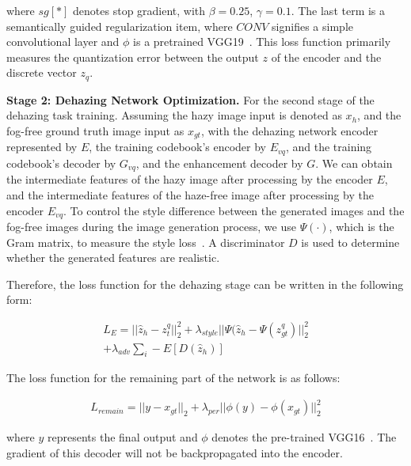 \documentclass[journal]{IEEEtran}
\begin{document}
\noindent where $sg[*]$ denotes stop gradient, with $\beta = 0.25$, $\gamma = 0.1$. The last term is a semantically guided regularization item, where $CONV$ signifies a simple convolutional layer and $\phi$ is a pretrained VGG19~\cite{simonyan2014very}. This loss function primarily measures the quantization error between the output $z$ of the encoder and the discrete vector $z_{q}$.

	{\bf{Stage 2: Dehazing Network Optimization.}} For the second stage of the dehazing task training. Assuming the hazy image input is denoted as $x_h$, and the fog-free ground truth image input as $x_{gt}$, with the dehazing network encoder represented by $E$, the training codebook's encoder by $E_{vq}$, and the training codebook's decoder by $G_{vq}$, and the enhancement decoder by $G$. We can obtain the intermediate features of the hazy image after processing by the encoder $E$, and the intermediate features of the haze-free image after processing by the encoder $E_{vq}$. To control the style difference between the generated images and the fog-free images during the image generation process, we use $\Psi(\cdot)$, which is the Gram matrix, to measure the style loss~\cite{gondal2019unreasonable}. A discriminator $D$ is used to determine whether the generated features are realistic.

Therefore, the loss function for the dehazing stage can be written in the following form:

\begin{equation}
	\label{encoder_loss}
	\begin{split}
		L_{E} =||\widehat{z}_{h} - z^{q}_{t} ||_{2}^{2} + \lambda_{style} ||\Psi(\widehat{z}_{h} - \Psi(z^{q}_{gt}) ||_{2}^{2} \\
		+ \lambda_{adv}\sum_{i} -E[D(\widehat{z}_{h})]
	\end{split}
\end{equation}

The loss function for the remaining part of the network is as follows:

\begin{equation}
	\label{rest_loss}
	\begin{split}
		L_{remain} =||y - x_{gt} ||_{2} + \lambda_{per} ||\phi(y) - \phi(x_{gt}) ||_{2}^{2}
	\end{split}
\end{equation}

\noindent where $y$ represents the final output and $\phi$ denotes the pre-trained VGG16~\cite{simonyan2014very}. The gradient of this decoder will not be backpropagated into the encoder.
\end{document}
